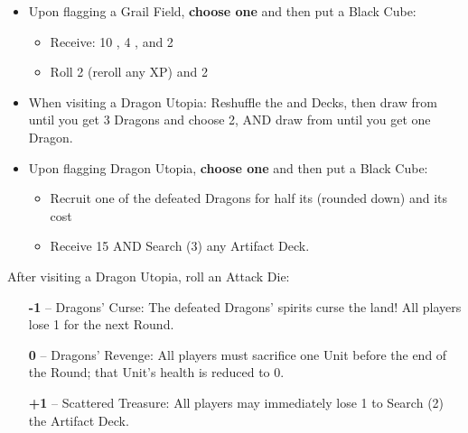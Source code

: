 \begin{multicols*}{2}
\begin{itemize}
  \item Upon flagging a Grail Field, \textbf{choose one} and then put a Black Cube:
  \begin{itemize}
    \item Receive: 10 , 4 , and 2 
    \item Roll 2  (reroll any XP) and 2 
  \end{itemize}
  \item When visiting a Dragon Utopia: Reshuffle the  and  Decks, then draw from  until you get 3 Dragons and choose 2, AND draw from  until you get one Dragon.
  \item Upon flagging Dragon Utopia, \textbf{choose one} and then put a Black Cube:
  \begin{itemize}
    \item Recruit one of the defeated Dragons for half its  (rounded down) and its  cost
    \item Receive 15  AND Search (3) any Artifact Deck.
  \end{itemize}
\end{itemize}

After visiting a Dragon Utopia, roll an Attack Die:
\begin{itemize}
  \item[\textbf{-1}] -- Dragons' Curse: The defeated Dragons’ spirits curse the land! All players lose 1  for the next Round.
  \item[\textbf{0}] -- Dragons' Revenge: All players must sacrifice one Unit before the end of the Round; that Unit's health is reduced to 0. 
  \item[ \textbf{+1}] -- Scattered Treasure: All players may immediately lose 1  to Search (2) the Artifact Deck.
\end{itemize}


\end{multicols*}
